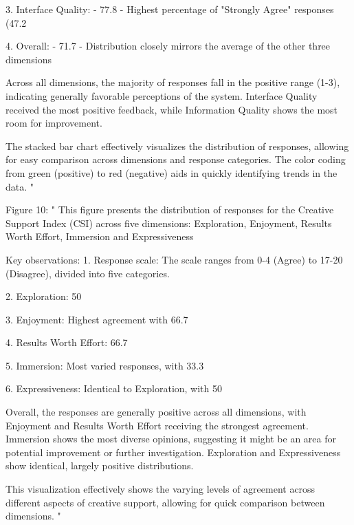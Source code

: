 3. Interface Quality:
   - 77.8%
   - Highest percentage of "Strongly Agree" responses (47.2%

4. Overall:
   - 71.7%
   - Distribution closely mirrors the average of the other three dimensions

Across all dimensions, the majority of responses fall in the positive range (1-3), indicating generally favorable perceptions of the system. Interface Quality received the most positive feedback, while Information Quality shows the most room for improvement.

The stacked bar chart effectively visualizes the distribution of responses, allowing for easy comparison across dimensions and response categories. The color coding from green (positive) to red (negative) aids in quickly identifying trends in the data.
"

Figure 10: "
This figure presents the distribution of responses for the Creative Support Index (CSI) across five dimensions: Exploration, Enjoyment, Results Worth Effort, Immersion and Expressiveness

Key observations:
1. Response scale: The scale ranges from 0-4 (Agree) to 17-20 (Disagree), divided into five categories.

2. Exploration: 50%

3. Enjoyment: Highest agreement with 66.7%

4. Results Worth Effort: 66.7%

5. Immersion: Most varied responses, with 33.3%

6. Expressiveness: Identical to Exploration, with 50%

Overall, the responses are generally positive across all dimensions, with Enjoyment and Results Worth Effort receiving the strongest agreement. Immersion shows the most diverse opinions, suggesting it might be an area for potential improvement or further investigation. Exploration and Expressiveness show identical, largely positive distributions.

This visualization effectively shows the varying levels of agreement across different aspects of creative support, allowing for quick comparison between dimensions.
"




